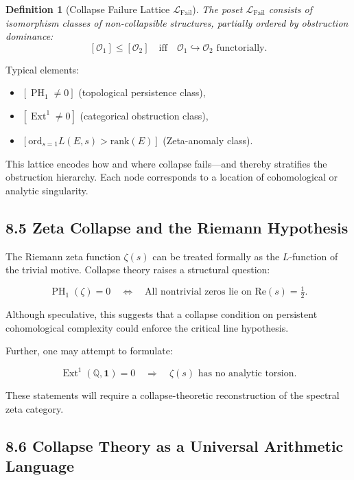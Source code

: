 \documentclass[11pt]{article}
\newtheorem{definition}[theorem]{Definition}
\DeclareMathOperator{\Ext}{Ext}
\DeclareMathOperator{\PH}{PH}
\newcommand{\QQ}{\mathbb{Q}}
\begin{document}
\begin{definition}[Collapse Failure Lattice $\mathcal{L}_{\mathrm{Fail}}$]
The poset $\mathcal{L}_{\mathrm{Fail}}$ consists of isomorphism classes of non-collapsible structures, partially ordered by obstruction dominance:
\[
[\mathcal{O}_1] \leq [\mathcal{O}_2] \quad \text{iff} \quad \mathcal{O}_1 \hookrightarrow \mathcal{O}_2 \text{ functorially}.
\]
\end{definition}

Typical elements:
\begin{itemize}
  \item $[\PH_1 \neq 0]$ (topological persistence class),
  \item $[\Ext^1 \neq 0]$ (categorical obstruction class),
  \item $[\mathrm{ord}_{s=1} L(E,s) > \mathrm{rank}(E)]$ (Zeta-anomaly class).
\end{itemize}

This lattice encodes how and where collapse fails—and thereby stratifies the obstruction hierarchy.  
Each node corresponds to a location of cohomological or analytic singularity.

\subsection{8.5 Zeta Collapse and the Riemann Hypothesis}

The Riemann zeta function $\zeta(s)$ can be treated formally as the $L$-function of the trivial motive.  
Collapse theory raises a structural question:

\[
\PH_1(\zeta) = 0 \quad \Leftrightarrow \quad \text{All nontrivial zeros lie on } \mathrm{Re}(s) = \tfrac{1}{2}.
\]

Although speculative, this suggests that a collapse condition on persistent cohomological complexity could enforce the critical line hypothesis.

Further, one may attempt to formulate:

\[
\Ext^1(\QQ, \mathbf{1}) = 0 \quad \Rightarrow \quad \zeta(s) \text{ has no analytic torsion}.
\]

These statements will require a collapse-theoretic reconstruction of the spectral zeta category.

\subsection{8.6 Collapse Theory as a Universal Arithmetic Language}
\end{document}

